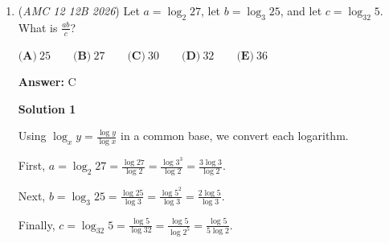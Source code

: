 \begin{enumerate}
Start by plugging in some values. Eventually, the values $-5$, $-3$, $-1$, and $1$ seem to result in integer solutions, which is $\boxed{\textbf{(C) } 4}$, and plugging in more values will not give any more integer answers.

 This is incorrect. Plugging in $3$ yields $\frac{8}{5}$.

 Indeed, the writer only states that $x+2$ must be the divisors of three. Maybe a misconception, perhaps?

 I think the values are wrong here. If you plug values in, you should eventually get $-5$, $-3$, $-1$, and $1$ as solutions

 Yeah, sorry about that. I fixed it. I meant that $n+2$ equals those values.

 Remark: Values where the numerator is 0 or the denominator is 1 will result in integer solutions, and those values are when n equals $-3$, $-1$, $1$. The value $-5$ comes from

 



\textbf{Solution 7 (kind of cheese, I guess)}

The goal is to make the numerator $0$ or the denominator $1$, and find the rest. $3$ makes the denominator 1. $1$ and $-1$ make the numerator 0. After trying a few more numbers, we can find out that $-5$ also works. So there are $\fbox{4}$ numbers

 


	\item (\textit{AMC 12 12B 2026}) Let $a = \log_{2}27$, let $b = \log_{3}25$, and let $c = \log_{32}5$. What is $\frac{ab}{c}$?


 $\textbf{(A)}\   25  \qquad                 \textbf{(B)}\   27  \qquad                 \textbf{(C)}\   30  \qquad                 \textbf{(D)}\   32  \qquad                 \textbf{(E)}\   36$

 \textbf{Answer: }C



\textbf{Solution 1}

Using $\log_x y=\frac{\log y}{\log x}$ in a common base, we convert each logarithm.

 First, $a=\log_{2}27=\frac{\log 27}{\log 2}=\frac{\log 3^3}{\log 2}=\frac{3\log 3}{\log 2}$.

 Next, $b=\log_{3}25=\frac{\log 25}{\log 3}=\frac{\log 5^2}{\log 3}=\frac{2\log 5}{\log 3}$.

 Finally, $c=\log_{32}5=\frac{\log 5}{\log 32}=\frac{\log 5}{\log 2^5}=\frac{\log 5}{5\log 2}$.


\end{enumerate}
